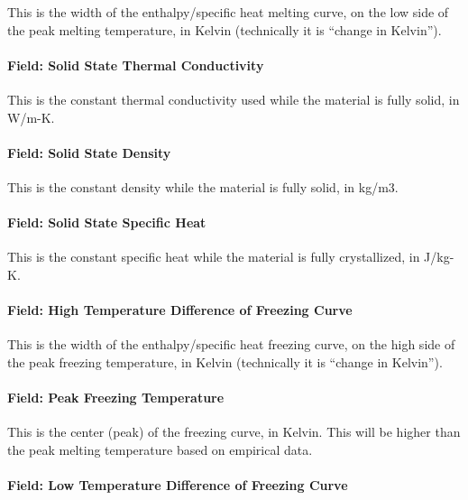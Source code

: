 This is the width of the enthalpy/specific heat melting curve, on the low side of the peak melting temperature, in Kelvin (technically it is ``change in Kelvin'').

\paragraph{Field: Solid State Thermal Conductivity}\label{materialpropertyphasechangehysteresis-inputs-solidk}

This is the constant thermal conductivity used while the material is fully solid, in W/m-K.

\paragraph{Field: Solid State Density}\label{materialpropertyphasechangehysteresis-inputs-solidrho}

This is the constant density while the material is fully solid, in kg/m3.

\paragraph{Field: Solid State Specific Heat}\label{materialpropertyphasechangehysteresis-inputs-solid-state-specific-heat}

This is the constant specific heat while the material is fully crystallized, in J/kg-K.

\paragraph{Field: High Temperature Difference of Freezing Curve}\label{materialpropertyphasechangehysteresis-inputs-high-temperature-difference-of-freezing-curve}

This is the width of the enthalpy/specific heat freezing curve, on the high side of the peak freezing temperature, in Kelvin (technically it is ``change in Kelvin'').

\paragraph{Field: Peak Freezing Temperature}\label{materialpropertyphasechangehysteresis-inputs-peak-freezing-temperature}

This is the center (peak) of the freezing curve, in Kelvin.  This will be higher than the peak melting temperature based on empirical data.

\paragraph{Field: Low Temperature Difference of Freezing Curve}\label{materialpropertyphasechangehysteresis-inputs-low-temperature-difference-of-freezing-curve}

